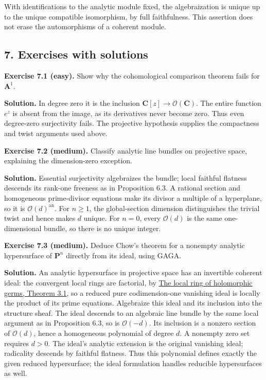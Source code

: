 \documentclass[11pt]{article}
\begin{document}
With identifications to the analytic module fixed, the algebraization is
unique up to the unique compatible isomorphism, by full faithfulness.
This assertion does not erase the automorphisms of a coherent module.

\subsection{7. Exercises with
solutions}\label{exercises-with-solutions-16}

\textbf{Exercise 7.1 (easy).} Show why the cohomological comparison
theorem fails for \(\mathbf A^1\).

\textbf{Solution.} In degree zero it is the inclusion
\(\mathbf C[z]\to\mathcal O(\mathbf C)\). The entire function \(e^z\) is
absent from the image, as its derivatives never become zero. Thus even
degree-zero surjectivity fails. The projective hypothesis supplies the
compactness and twist arguments used above.

\textbf{Exercise 7.2 (medium).} Classify analytic line bundles on
projective space, explaining the dimension-zero exception.

\textbf{Solution.} Essential surjectivity algebraizes the bundle; local
faithful flatness descends its rank-one freeness as in Proposition 6.3.
A rational section and homogeneous prime-divisor equations make its
divisor a multiple of a hyperplane, so it is
\(\mathcal O(d)^{\mathrm{an}}\). For \(n\geq1\), the global-section
dimension distinguishes the trivial twist and hence makes \(d\) unique.
For \(n=0\), every \(\mathcal O(d)\) is the same one-dimensional bundle,
so there is no unique integer.

\textbf{Exercise 7.3 (medium).} Deduce Chow's theorem for a nonempty
analytic hypersurface of \(\mathbf P^n\) directly from its ideal, using
GAGA.

\textbf{Solution.} An analytic hypersurface in projective space has an
invertible coherent ideal: the convergent local rings are factorial, by
\href{../complex-analytic-spaces-and-coherent-sheaves/the-local-ring-of-holomorphic-germs.html\#3-unique-factorization}{The
local ring of holomorphic germs, Theorem 3.1}, so a reduced pure
codimension-one vanishing ideal is locally the product of its prime
equations. Algebraize this ideal and its inclusion into the structure
sheaf. The ideal descends to an algebraic line bundle by the same local
argument as in Proposition 6.3, so is \(\mathcal O(-d)\). Its inclusion
is a nonzero section of \(\mathcal O(d)\), hence a homogeneous
polynomial of degree \(d\). A nonempty zero set requires \(d>0\). The
ideal's analytic extension is the original vanishing ideal; radicality
descends by faithful flatness. Thus this polynomial defines exactly the
given reduced hypersurface; the ideal formulation handles reducible
hypersurfaces as well.
\end{document}
